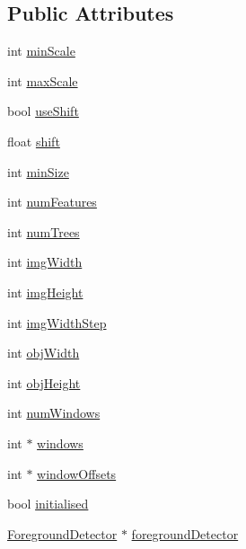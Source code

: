 \subsection*{Public Attributes}
\begin{DoxyCompactItemize}
\item 
int \hyperlink{classtld_1_1_detector_cascade_a24aed44c48fe4616465a556bd6642d5e}{minScale}
\item 
int \hyperlink{classtld_1_1_detector_cascade_aac2cd4b31c290d1eeba69591cbb65ce4}{maxScale}
\item 
bool \hyperlink{classtld_1_1_detector_cascade_a2549b35ac099860f20a13ef830081bbb}{useShift}
\item 
float \hyperlink{classtld_1_1_detector_cascade_a18b12b643d662cc9c8850c963079233c}{shift}
\item 
int \hyperlink{classtld_1_1_detector_cascade_add27e1ff17e2fda214d08f74d0c164e9}{minSize}
\item 
int \hyperlink{classtld_1_1_detector_cascade_a63af0a8c55ac292b25f2f72b6e734280}{numFeatures}
\item 
int \hyperlink{classtld_1_1_detector_cascade_a2d41ea56f304562878151ae09c34aa8f}{numTrees}
\item 
int \hyperlink{classtld_1_1_detector_cascade_a593db7c6ab225f17ac02cd9ef5faebd2}{imgWidth}
\item 
int \hyperlink{classtld_1_1_detector_cascade_a4e9b954d0b95f6e91d479bba9ec6beac}{imgHeight}
\item 
int \hyperlink{classtld_1_1_detector_cascade_aa47c6463f1ae23868551a4c82c555f24}{imgWidthStep}
\item 
int \hyperlink{classtld_1_1_detector_cascade_a1c7a7fddb085fca4577779110637c5c8}{objWidth}
\item 
int \hyperlink{classtld_1_1_detector_cascade_a1186ed695cf6e9f00d180ec92e4aa1ea}{objHeight}
\item 
int \hyperlink{classtld_1_1_detector_cascade_a700932efdadfdd218697b56aa7703b4b}{numWindows}
\item 
int $\ast$ \hyperlink{classtld_1_1_detector_cascade_a0acc3bf212228a7b3d47b2d795f1a5a4}{windows}
\item 
int $\ast$ \hyperlink{classtld_1_1_detector_cascade_a259b095591f3d09904277ff844d94b0b}{windowOffsets}
\item 
bool \hyperlink{classtld_1_1_detector_cascade_a4a61cd265a92bce6f8f148db532a1789}{initialised}
\item 
\hyperlink{classtld_1_1_foreground_detector}{ForegroundDetector} $\ast$ \hyperlink{classtld_1_1_detector_cascade_ad03faad5b05805f5edba330cccfee1f1}{foregroundDetector}

\end{DoxyCompactItemize}

